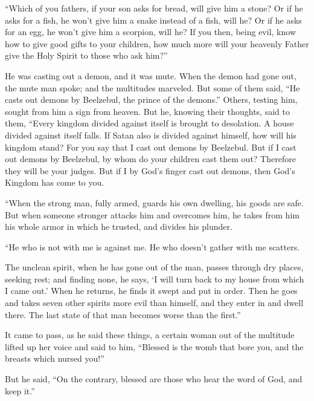  ``Which of you fathers, if your son asks for bread, will
give him a stone? Or if he asks for a fish, he won't give him a snake
instead of a fish, will he?  Or if he asks for an egg, he
won't give him a scorpion, will he?  If you then, being
evil, know how to give good gifts to your children, how much more will
your heavenly Father give the Holy Spirit to those who ask him?''

 He was casting out a demon, and it was mute. When the
demon had gone out, the mute man spoke; and the multitudes marveled.
 But some of them said, ``He casts out demons by Beelzebul,
the prince of the demons.''  Others, testing him, sought
from him a sign from heaven.  But he, knowing their
thoughts, said to them, ``Every kingdom divided against itself is
brought to desolation. A house divided against itself falls.
 If Satan also is divided against himself, how will his
kingdom stand? For you say that I cast out demons by Beelzebul.
 But if I cast out demons by Beelzebul, by whom do your
children cast them out? Therefore they will be your judges.
 But if I by God's finger cast out demons, then God's
Kingdom has come to you.

 ``When the strong man, fully armed, guards his own
dwelling, his goods are safe.  But when someone stronger
attacks him and overcomes him, he takes from him his whole armor in
which he trusted, and divides his plunder.

 ``He who is not with me is against me. He who doesn't
gather with me scatters.

 The unclean spirit, when he has gone out of the man,
passes through dry places, seeking rest; and finding none, he says, `I
will turn back to my house from which I came out.'  When he
returns, he finds it swept and put in order.  Then he goes
and takes seven other spirits more evil than himself, and they enter in
and dwell there. The last state of that man becomes worse than the
first.''

 It came to pass, as he said these things, a certain woman
out of the multitude lifted up her voice and said to him, ``Blessed is
the womb that bore you, and the breasts which nursed you!''

 But he said, ``On the contrary, blessed are those who hear
the word of God, and keep it.''

